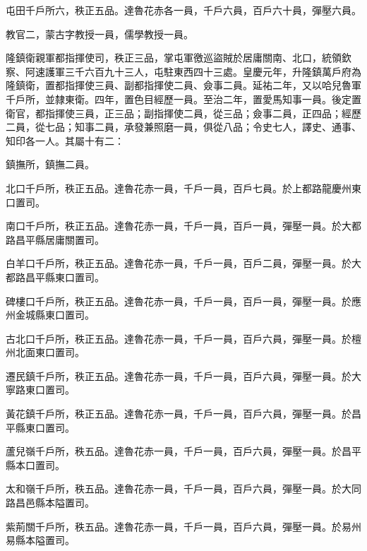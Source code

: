 \begin{pinyinscope}
 屯田千戶所六，秩正五品。達魯花赤各一員，千戶六員，百戶六十員，彈壓六員。



 教官二，蒙古字教授一員，儒學教授一員。



 隆鎮衛親軍都指揮使司，秩正三品，掌屯軍徼巡盜賊於居庸關南、北口，統領欽察、阿速護軍三千六百九十三人，屯駐東西四十三處。皇慶元年，升隆鎮萬戶府為隆鎮衛，置都指揮使三員、副都指揮使二員、僉事二員。延祐二年，又以哈兒魯軍千戶所，並隸東衛。四年，置色目經歷一員。至治二年，置愛馬知事一員。後定置衛官，都指揮使三員，正三品；副指揮使二員，從三品；僉事二員，正四品；經歷二員，從七品；知事二員，承發兼照磨一員，俱從八品；令史七人，譯史、通事、知印各一人。其屬十有二：



 鎮撫所，鎮撫二員。



 北口千戶所，秩正五品。達魯花赤一員，千戶一員，百戶七員。於上都路龍慶州東口置司。



 南口千戶所，秩正五品。達魯花赤一員，千戶一員，百戶一員，彈壓一員。於大都路昌平縣居庸關置司。



 白羊口千戶所，秩正五品。達魯花赤一員，千戶一員，百戶二員，彈壓一員。於大都路昌平縣東口置司。



 碑樓口千戶所，秩正五品。達魯花赤一員，千戶一員，百戶一員，彈壓一員。於應州金城縣東口置司。



 古北口千戶所，秩正五品。達魯花赤一員，千戶一員，百戶六員，彈壓一員。於檀州北面東口置司。



 遷民鎮千戶所，秩正五品。達魯花赤一員，千戶一員，百戶六員，彈壓一員。於大寧路東口置司。



 黃花鎮千戶所，秩正五品。達魯花赤一員，千戶一員，百戶六員，彈壓一員。於昌平縣東口置司。



 蘆兒嶺千戶所，秩五品。達魯花赤一員，千戶一員，百戶六員，彈壓一員。於昌平縣本口置司。



 太和嶺千戶所，秩五品。達魯花赤一員，千戶一員，百戶六員，彈壓一員。於大同路昌邑縣本隘置司。



 紫荊關千戶所，秩五品。達魯花赤一員，千戶一員，百戶六員，彈壓一員。於易州易縣本隘置司。




\end{pinyinscope}

